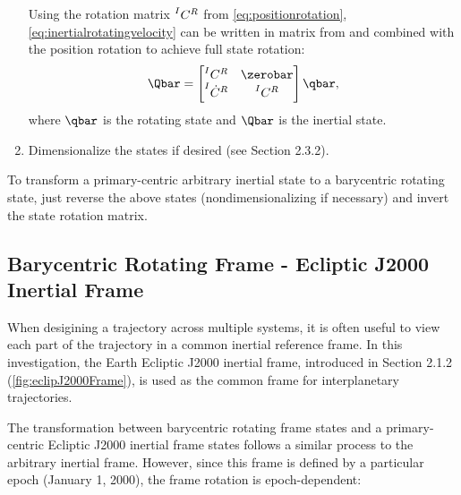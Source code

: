 \begin{enumerate}
            Using the rotation matrix $\prescript{I}{}{C}^{R}$ from \cref{eq:positionrotation},
            \cref{eq:inertialrotatingvelocity} can be written in matrix from and combined with the
            position rotation to achieve full state rotation:
            \begin{equation}
                \Qbar=\begin{bmatrix}   \prescript{I}{}{C}^{R}      &   \zerobar                \\
                                        \prescript{I}{}{\dot{C}}^{R} &   \prescript{I}{}{C}^{R}  \end{bmatrix}\qbar,
                \label{eq:rotation}
            \end{equation}
            where $\qbar$ is the rotating state and $\Qbar$ is the inertial state.
    \item   Dimensionalize the states if desired (see Section 2.3.2).
\end{enumerate}

To transform a primary-centric arbitrary inertial state to a barycentric rotating state, just
reverse the above states (nondimensionalizing if necessary) and invert the state rotation matrix.

\subsection{Barycentric Rotating Frame - Ecliptic J2000 Inertial Frame}
When desigining a trajectory across multiple systems, it is often useful to view each part of the
trajectory in a common inertial reference frame. In this investigation, the Earth Ecliptic J2000
inertial frame, introduced in Section 2.1.2 (\cref{fig:eclipJ2000Frame}), is used as the common
frame for interplanetary trajectories.

The transformation between barycentric rotating frame states and a primary-centric Ecliptic J2000
inertial frame states follows a similar process to the arbitrary inertial frame. However, since
this frame is defined by a particular epoch (January 1, 2000), the frame rotation is
epoch-dependent:

